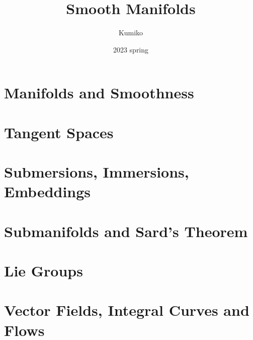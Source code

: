 \documentclass{kumikoNotes}
\title{\Huge{Smooth Manifolds}}
\author{Kumiko}
\date{2023 spring}
\begin{document}

%

\maketitle

\frontmatter
\tableofcontents

\mainmatter

\chapter{Manifolds and Smoothness}
    
    

\chapter{Tangent Spaces}
    
    
    
    
    
    
\chapter{Submersions, Immersions, Embeddings}
    
    
    


\chapter{Submanifolds and Sard's Theorem}
    
    

\chapter{Lie Groups}
    
    
    


\chapter{Vector Fields, Integral Curves and Flows}
    
    
\end{document}

